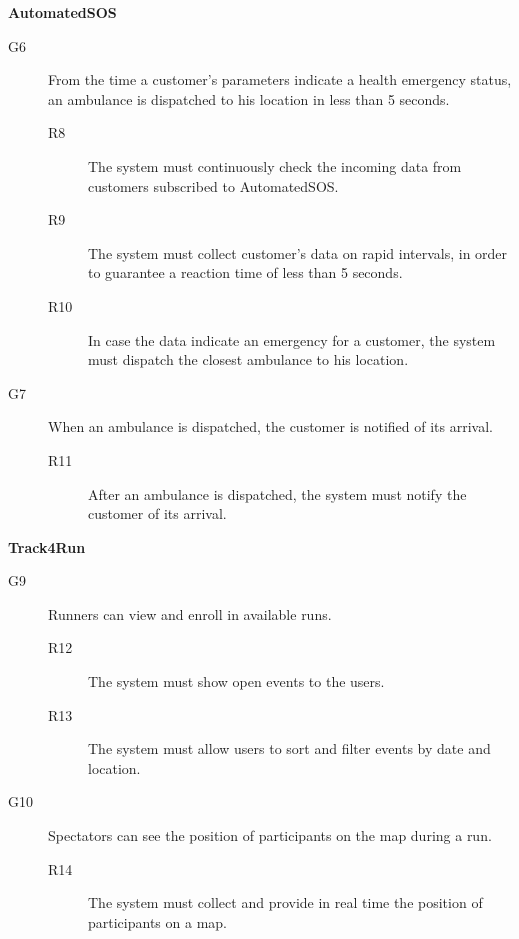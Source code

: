 \documentclass[../main.tex]{subfiles}
\begin{document}
\vspace{8mm}

{\bf AutomatedSOS}
\begin{description}
	\item [G6]  From the time a customer's parameters indicate a health emergency status, an ambulance is dispatched to his location in less than 5 seconds.
	\begin{description}
		\item [R8] The system must continuously check the incoming data from customers subscribed to AutomatedSOS.
		\item [R9] The system must collect customer's data on rapid intervals, in order to guarantee a reaction time of less than 5 seconds.
		\item [R10] In case the data indicate an emergency for a customer, the system must dispatch the closest ambulance to his location.
	\end{description}

	\item [G7]  When an ambulance is dispatched, the customer is notified of its arrival.
	\begin{description}
		\item [R11] After an ambulance is dispatched, the system must notify the customer of its arrival.
	\end{description}
\end{description}

\vspace{8mm}

{\bf Track4Run}
\begin{description}

	\item [G9]  Runners can view and enroll in available runs.
	\begin{description}
		\item [R12] The system must show open events to the users.
		\item [R13] The system must allow users to sort and filter events by date and location.
	\end{description}

	\item [G10] Spectators can see the position of participants on the map during a run.
	\begin{description}
		\item [R14] The system must collect and provide in real time the position of participants on a map.
	\end{description}
\end{description}
\end{document}
